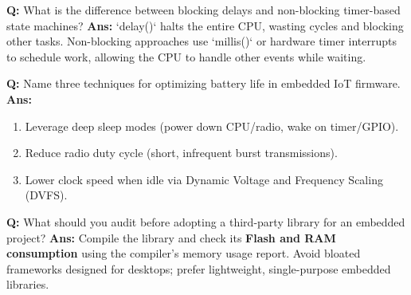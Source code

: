 \documentclass[10pt,a4paper,twocolumn]{article}
\begin{document}
\begin{tcolorbox}[
  colback=white,
  colframe=UnitColorEight,
  colbacktitle=gray!10!white,
  coltitle=black,
  fonttitle=\bfseries\sffamily\small,
  title={Unit VIII $\bullet$ Card 2},
  boxrule=1.2pt,
  arc=2mm,
  outer arc=2mm,
  boxsep=1.5mm,
  top=1mm,
  bottom=1mm,
  left=1.5mm,
  right=1.5mm,
  before skip=2.5mm,
  after skip=2.5mm
]
\textbf{Q:} What is the difference between blocking delays and non-blocking timer-based state machines?
\tcbline
\textbf{Ans:} `delay()` halts the entire CPU, wasting cycles and blocking other tasks. Non-blocking approaches use `millis()` or hardware timer interrupts to schedule work, allowing the CPU to handle other events while waiting.
\end{tcolorbox}


\begin{tcolorbox}[
  colback=white,
  colframe=UnitColorEight,
  colbacktitle=gray!10!white,
  coltitle=black,
  fonttitle=\bfseries\sffamily\small,
  title={Unit VIII $\bullet$ Card 3},
  boxrule=1.2pt,
  arc=2mm,
  outer arc=2mm,
  boxsep=1.5mm,
  top=1mm,
  bottom=1mm,
  left=1.5mm,
  right=1.5mm,
  before skip=2.5mm,
  after skip=2.5mm
]
\textbf{Q:} Name three techniques for optimizing battery life in embedded IoT firmware.
\tcbline
\textbf{Ans:} \begin{enumerate}
  \item Leverage deep sleep modes (power down CPU/radio, wake on timer/GPIO).
  \item Reduce radio duty cycle (short, infrequent burst transmissions).
  \item Lower clock speed when idle via Dynamic Voltage and Frequency Scaling (DVFS).
\end{enumerate}
\end{tcolorbox}


\begin{tcolorbox}[
  colback=white,
  colframe=UnitColorEight,
  colbacktitle=gray!10!white,
  coltitle=black,
  fonttitle=\bfseries\sffamily\small,
  title={Unit VIII $\bullet$ Card 4},
  boxrule=1.2pt,
  arc=2mm,
  outer arc=2mm,
  boxsep=1.5mm,
  top=1mm,
  bottom=1mm,
  left=1.5mm,
  right=1.5mm,
  before skip=2.5mm,
  after skip=2.5mm
]
\textbf{Q:} What should you audit before adopting a third-party library for an embedded project?
\tcbline
\textbf{Ans:} Compile the library and check its \textbf{Flash and RAM consumption} using the compiler's memory usage report. Avoid bloated frameworks designed for desktops; prefer lightweight, single-purpose embedded libraries.
\end{tcolorbox}
\end{document}
